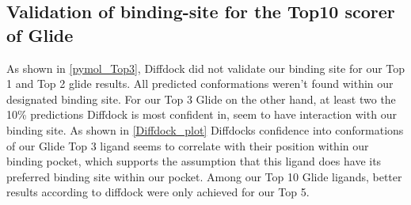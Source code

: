 \documentclass[11pt, letterpaper, titlepage]{article}
\begin{document}
\subsection{Validation of binding-site for the Top10 scorer of Glide}
As shown in \autoref{pymol_Top3}, Diffdock did not validate our binding site for our Top 1 and Top 2 glide results. All predicted conformations weren't found within our designated binding site. For our Top 3 Glide on the other hand, at least two the 10\% predictions Diffdock is most confident in, seem to have interaction with our binding site. As shown in \autoref{Diffdock_plot} Diffdocks confidence into conformations of our Glide Top 3 ligand seems to correlate with their position within our binding pocket, which supports the assumption that this ligand does have its preferred binding site within our pocket. Among our Top 10 Glide ligands, better results according to diffdock were only achieved for our Top 5.
\end{document}
